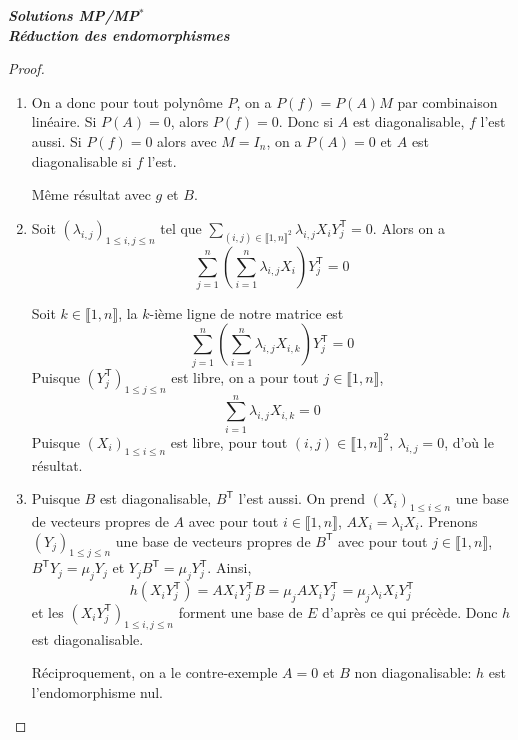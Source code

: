 \documentclass[12pt]{article}
\begin{document}
\begin{titlepage}
	\centering
	\vspace*{\fill}
	\Huge \textit{\textbf{Solutions MP/MP$^*$\\ Réduction des endomorphismes}}
	\vspace*{\fill}
\end{titlepage}

\begin{proof}
	\phantom{}
	\begin{enumerate}
		\item On a  donc pour tout polynôme $P$, on a $P(f)=P(A)M$ par combinaison linéaire. Si $P(A)=0$, alors $P(f)=0$. Donc si $A$ est diagonalisable, $f$ l'est aussi. Si $P(f)=0$ alors avec $M=I_{n}$, on a $P(A)=0$ et $A$ est diagonalisable si $f$ l'est.
		
		Même résultat avec $g$ et $B$.

		\item Soit $(\lambda_{i,j})_{1\leqslant i,j\leqslant n}$ tel que $\sum_{(i,j)\in\llbracket1,n\rrbracket^{2}}\lambda_{i,j}X_{i}Y_{j}^{\mathsf{T}}=0$. Alors on a 
		\begin{equation}
			\sum_{j=1}^{n}\left(\sum_{i=1}^{n}\lambda_{i,j}X_{i}\right)Y_{j}^{\mathsf{T}}=0
		\end{equation}

		Soit $k\in\llbracket1,n\rrbracket$, la $k$-ième ligne de notre matrice est 
		\begin{equation}
			\sum_{j=1}^{n}\left(\sum_{i=1}^{n}\lambda_{i,j}X_{i,k}\right)Y_{j}^{\mathsf{T}}=0
		\end{equation}
		Puisque $(Y_{j}^{\mathsf{T}})_{1\leqslant j\leqslant n}$ est libre, on a pour tout $j\in\llbracket1,n\rrbracket$,
		\begin{equation}
			\sum_{i=1}^{n}\lambda_{i,j}X_{i,k}=0
		\end{equation}
		Puisque $(X_{i})_{1\leqslant i\leqslant n}$ est libre, pour tout $(i,j)\in\llbracket1,n\rrbracket^{2}$, $\lambda_{i,j}=0$, d'où le résultat.

		\item Puisque $B$ est diagonalisable, $B^{\mathsf{T}}$ l'est aussi. On prend $(X_{i})_{1\leqslant i\leqslant n}$ une base de vecteurs propres de $A$ avec pour tout $i\in\llbracket1,n\rrbracket$, $AX_{i}=\lambda_{i}X_{i}$. Prenons $(Y_{j})_{1\leqslant j\leqslant n}$ une base de vecteurs propres de $B^{\mathsf{T}}$ avec pour tout $j\in\llbracket1,n\rrbracket$, $B^{\mathsf{T}}Y_{j}=\mu_{j}Y_{j}$ et $Y_{j}B^{\mathsf{T}}=\mu_{j}Y_{j}^{\mathsf{T}}$. Ainsi,
		\begin{equation}
			h\left(X_{i}Y_{j}^{\mathsf{T}}\right)=AX_{i}Y_{j}^{\mathsf{T}}B=\mu_{j}AX_{i}Y_{j}^{\mathsf{T}}=\mu_{j}\lambda_{i}X_{i}Y_{j}^{\mathsf{T}}
		\end{equation}
		et les $(X_{i}Y_{j}^{\mathsf{T}})_{1\leqslant i,j\leqslant n}$ forment une base de $E$ d'après ce qui précède. Donc $h$ est diagonalisable.

		Réciproquement, on a le contre-exemple $A=0$ et $B$ non diagonalisable: $h$ est l'endomorphisme nul.
	\end{enumerate}	
\end{proof}
\end{document}
